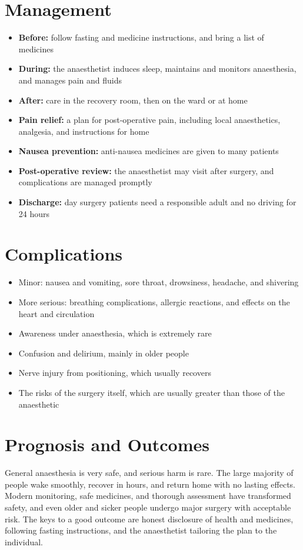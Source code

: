 \section*{Management}
\begin{itemize}
    \item \textbf{Before:} follow fasting and medicine instructions, and bring a list of medicines
    \item \textbf{During:} the anaesthetist induces sleep, maintains and monitors anaesthesia, and manages pain and fluids
    \item \textbf{After:} care in the recovery room, then on the ward or at home
    \item \textbf{Pain relief:} a plan for post-operative pain, including local anaesthetics, analgesia, and instructions for home
    \item \textbf{Nausea prevention:} anti-nausea medicines are given to many patients
    \item \textbf{Post-operative review:} the anaesthetist may visit after surgery, and complications are managed promptly
    \item \textbf{Discharge:} day surgery patients need a responsible adult and no driving for 24 hours
\end{itemize}

\section*{Complications}
\begin{itemize}
    \item Minor: nausea and vomiting, sore throat, drowsiness, headache, and shivering
    \item More serious: breathing complications, allergic reactions, and effects on the heart and circulation
    \item Awareness under anaesthesia, which is extremely rare
    \item Confusion and delirium, mainly in older people
    \item Nerve injury from positioning, which usually recovers
    \item The risks of the surgery itself, which are usually greater than those of the anaesthetic
\end{itemize}

\section*{Prognosis and Outcomes}
General anaesthesia is very safe, and serious harm is rare. The large majority of people wake smoothly, recover in hours, and return home with no lasting effects. Modern monitoring, safe medicines, and thorough assessment have transformed safety, and even older and sicker people undergo major surgery with acceptable risk. The keys to a good outcome are honest disclosure of health and medicines, following fasting instructions, and the anaesthetist tailoring the plan to the individual.

